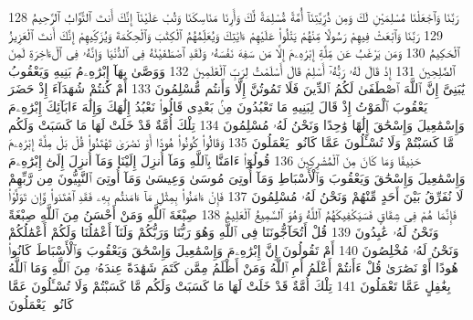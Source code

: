 {\tiny\colorbox{cl_aya}{128}} رَبَّنَا وَٱجْعَلْنَا مُسْلِمَيْنِ لَكَ وَمِن ذُرِّيَّتِنَآ أُمَّةً مُّسْلِمَةً لَّكَ وَأَرِنَا مَنَاسِكَنَا وَتُبْ عَلَيْنَآ إِنَّكَ أَنتَ ٱلتَّوَّابُ ٱلرَّحِيمُ
{\tiny\colorbox{cl_aya}{129}} رَبَّنَا وَٱبْعَثْ فِيهِمْ رَسُولًا مِّنْهُمْ يَتْلُوا۟ عَلَيْهِمْ ءَايَٰتِكَ وَيُعَلِّمُهُمُ ٱلْكِتَٰبَ وَٱلْحِكْمَةَ وَيُزَكِّيهِمْ إِنَّكَ أَنتَ ٱلْعَزِيزُ ٱلْحَكِيمُ
{\tiny\colorbox{cl_aya}{130}} وَمَن يَرْغَبُ عَن مِّلَّةِ إِبْرَٰهِۦمَ إِلَّا مَن سَفِهَ نَفْسَهُۥ وَلَقَدِ ٱصْطَفَيْنَٰهُ فِى ٱلدُّنْيَا وَإِنَّهُۥ فِى ٱلْءَاخِرَةِ لَمِنَ ٱلصَّٰلِحِينَ
{\tiny\colorbox{cl_aya}{131}} إِذْ قَالَ لَهُۥ رَبُّهُۥٓ أَسْلِمْ قَالَ أَسْلَمْتُ لِرَبِّ ٱلْعَٰلَمِينَ
{\tiny\colorbox{cl_aya}{132}} وَوَصَّىٰ بِهَآ إِبْرَٰهِۦمُ بَنِيهِ وَيَعْقُوبُ يَٰبَنِىَّ إِنَّ ٱللَّهَ ٱصْطَفَىٰ لَكُمُ ٱلدِّينَ فَلَا تَمُوتُنَّ إِلَّا وَأَنتُم مُّسْلِمُونَ
{\tiny\colorbox{cl_aya}{133}} أَمْ كُنتُمْ شُهَدَآءَ إِذْ حَضَرَ يَعْقُوبَ ٱلْمَوْتُ إِذْ قَالَ لِبَنِيهِ مَا تَعْبُدُونَ مِنۢ بَعْدِى قَالُوا۟ نَعْبُدُ إِلَٰهَكَ وَإِلَٰهَ ءَابَآئِكَ إِبْرَٰهِۦمَ وَإِسْمَٰعِيلَ وَإِسْحَٰقَ إِلَٰهًا وَٰحِدًا وَنَحْنُ لَهُۥ مُسْلِمُونَ
{\tiny\colorbox{cl_aya}{134}} تِلْكَ أُمَّةٌ قَدْ خَلَتْ لَهَا مَا كَسَبَتْ وَلَكُم مَّا كَسَبْتُمْ وَلَا تُسْـَٔلُونَ عَمَّا كَانُوا۟ يَعْمَلُونَ
{\tiny\colorbox{cl_aya}{135}} وَقَالُوا۟ كُونُوا۟ هُودًا أَوْ نَصَٰرَىٰ تَهْتَدُوا۟ قُلْ بَلْ مِلَّةَ إِبْرَٰهِۦمَ حَنِيفًا وَمَا كَانَ مِنَ ٱلْمُشْرِكِينَ
{\tiny\colorbox{cl_aya}{136}} قُولُوٓا۟ ءَامَنَّا بِٱللَّهِ وَمَآ أُنزِلَ إِلَيْنَا وَمَآ أُنزِلَ إِلَىٰٓ إِبْرَٰهِۦمَ وَإِسْمَٰعِيلَ وَإِسْحَٰقَ وَيَعْقُوبَ وَٱلْأَسْبَاطِ وَمَآ أُوتِىَ مُوسَىٰ وَعِيسَىٰ وَمَآ أُوتِىَ ٱلنَّبِيُّونَ مِن رَّبِّهِمْ لَا نُفَرِّقُ بَيْنَ أَحَدٍ مِّنْهُمْ وَنَحْنُ لَهُۥ مُسْلِمُونَ
{\tiny\colorbox{cl_aya}{137}} فَإِنْ ءَامَنُوا۟ بِمِثْلِ مَآ ءَامَنتُم بِهِۦ فَقَدِ ٱهْتَدَوا۟ وَّإِن تَوَلَّوْا۟ فَإِنَّمَا هُمْ فِى شِقَاقٍ فَسَيَكْفِيكَهُمُ ٱللَّهُ وَهُوَ ٱلسَّمِيعُ ٱلْعَلِيمُ
{\tiny\colorbox{cl_aya}{138}} صِبْغَةَ ٱللَّهِ وَمَنْ أَحْسَنُ مِنَ ٱللَّهِ صِبْغَةً وَنَحْنُ لَهُۥ عَٰبِدُونَ
{\tiny\colorbox{cl_aya}{139}} قُلْ أَتُحَآجُّونَنَا فِى ٱللَّهِ وَهُوَ رَبُّنَا وَرَبُّكُمْ وَلَنَآ أَعْمَٰلُنَا وَلَكُمْ أَعْمَٰلُكُمْ وَنَحْنُ لَهُۥ مُخْلِصُونَ
{\tiny\colorbox{cl_aya}{140}} أَمْ تَقُولُونَ إِنَّ إِبْرَٰهِۦمَ وَإِسْمَٰعِيلَ وَإِسْحَٰقَ وَيَعْقُوبَ وَٱلْأَسْبَاطَ كَانُوا۟ هُودًا أَوْ نَصَٰرَىٰ قُلْ ءَأَنتُمْ أَعْلَمُ أَمِ ٱللَّهُ وَمَنْ أَظْلَمُ مِمَّن كَتَمَ شَهَٰدَةً عِندَهُۥ مِنَ ٱللَّهِ وَمَا ٱللَّهُ بِغَٰفِلٍ عَمَّا تَعْمَلُونَ
{\tiny\colorbox{cl_aya}{141}} تِلْكَ أُمَّةٌ قَدْ خَلَتْ لَهَا مَا كَسَبَتْ وَلَكُم مَّا كَسَبْتُمْ وَلَا تُسْـَٔلُونَ عَمَّا كَانُوا۟ يَعْمَلُونَ
